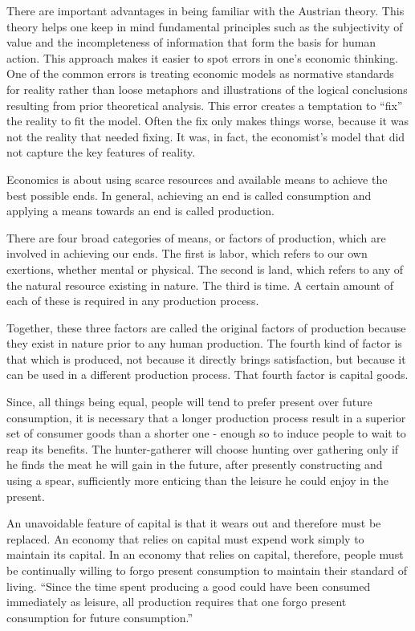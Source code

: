 There are important advantages in being familiar with the Austrian theory. This theory helps one keep in mind fundamental principles such as the subjectivity of value and the incompleteness of information that form the basis for human action. This approach makes it easier to spot errors in one’s economic thinking. One of the common errors is treating economic models as normative standards for reality rather than loose metaphors and illustrations of the logical conclusions resulting from prior theoretical analysis. This error creates a temptation to ``fix'' the reality to fit the model. Often the fix only makes things worse, because it was not the reality that needed fixing. It was, in fact, the economist’s model that did not capture the key features of reality.

Economics is about using scarce resources and available means to achieve the best possible ends. In general, achieving an end is called consumption and applying a means towards an end is called production.

There are four broad categories of means, or factors of production, which are involved in achieving our ends. The first is labor, which refers to our own exertions, whether mental or physical. The second is land, which refers to any of the natural resource existing in nature. The third is time. A certain amount of each of these is required in any production process.

Together, these three factors are called the original factors of production because they exist in nature prior to any human production. The fourth kind of factor is that which is produced, not because it directly brings satisfaction, but because it can be used in a different production process. That fourth factor is capital goods.

Since, all things being equal, people will tend to prefer present over future consumption, it is necessary that a longer production process result in a superior set of consumer goods than a shorter one - enough so to induce people to wait to reap its benefits. The hunter-gatherer will choose hunting over gathering only if he finds the meat he will gain in the future, after presently constructing and using a spear, sufficiently more enticing than the leisure he could enjoy in the present.

An unavoidable feature of capital is that it wears out and therefore must be replaced. An economy that relies on capital must expend work simply to maintain its capital. In an economy that relies on capital, therefore, people must be continually willing to forgo present consumption to maintain their standard of living. ``Since the time spent producing a good could have been consumed immediately as leisure, all production requires that one forgo present consumption for future consumption.''

